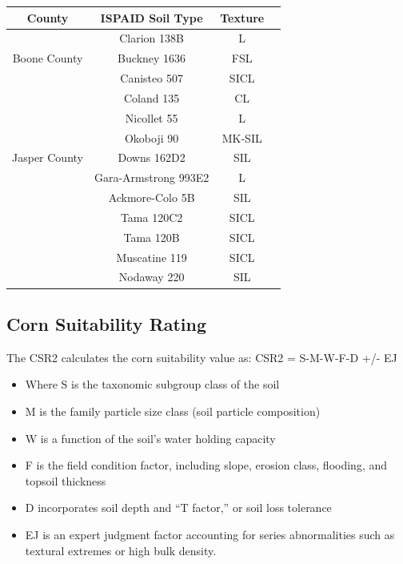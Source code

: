 \documentclass[11pt]{article}
\begin{document}
\begin{center}
\begin{tabular}{ |c|c|c|c| } 
\hline
County & ISPAID Soil Type & Texture \\
\hline
\multirow{3}{7em}{Boone County} & Clarion 138B & L \\ 
& Buckney 1636 & FSL \\ 
& Canisteo 507 & SICL \\ 
& Coland 135   & CL  \\
& Nicollet 55  & L   \\
& Okoboji 90   & MK-SIL \\
\hline
Jasper County & Downs 162D2 & SIL \\
& Gara-Armstrong 993E2 & L \\
& Ackmore-Colo 5B & SIL\\
& Tama 120C2 & SICL \\
& Tama 120B  & SICL \\
& Muscatine 119 & SICL \\
& Nodaway 220 & SIL \\
\hline
\end{tabular}
\end{center}

\subsection{Corn Suitability Rating}
The CSR2 calculates the corn suitability value as:
CSR2 = S-M-W-F-D +/- EJ
\begin{itemize}
\item Where S is the taxonomic subgroup class of the soil 
\item M is the family particle size class (soil particle composition)
\item W is a function of the soil’s water holding capacity
\item F is the field condition factor, including slope, erosion class, flooding, and topsoil thickness
\item D incorporates soil depth and “T factor,” or soil loss tolerance
\item EJ is an expert judgment factor accounting for series abnormalities such as textural extremes or high bulk density.\cite{32} 
\end{itemize}

\newpage
\end{document}
